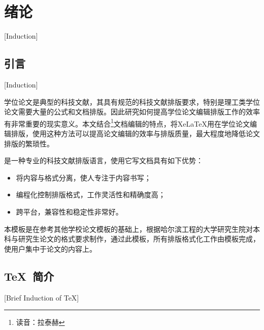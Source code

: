 
%
%
%


\chapter{绪论}[Induction]
\label{chap01}

\section{引言}[Induction]

学位论文是典型的科技文献，其具有规范的科技文献排版要求，特别是理工类学位论文需要大量的公式和文档排版。因此研究如何提高学位论文编辑排版工作的效率有非常重要的现实意义。本文结合\XeLaTeX{}\footnote{读音：拉泰赫}文档编辑的特点，将Xe\LaTeX{}用在学位论文编辑排版，使用这种方法可以提高论文编辑的效率与排版质量，最大程度地降低论文排版的繁琐性。

\XeLaTeX{}是一种专业的科技文献排版语言，使用它写文档具有如下优势：
\begin{itemize}
  \item 将内容与格式分离，使人专注于内容书写；
  \item 编程化控制排版格式，工作灵活性和精确度高；
  \item 跨平台，兼容性和稳定性非常好。
\end{itemize}

本模板是在参考其他学校论文模板的基础上，根据哈尔滨工程的大学研究生院对本科与研究生论文的格式要求制作，通过此模板，所有排版格式化工作由模板完成，使用户集中于论文的内容上。

\section{TeX~简介}[Brief Induction of TeX]

